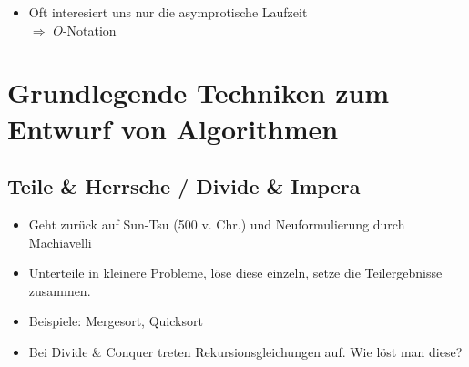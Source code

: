\begin{itemize}
\item   Oft interesiert uns nur die asymprotische Laufzeit \\
        $\Rightarrow$ $O$-Notation
\end{itemize}

\chapter{Grundlegende Techniken zum Entwurf von Algorithmen}
\section{Teile \& Herrsche / Divide \& Impera}
\begin{itemize}
\item   Geht zurück auf Sun-Tsu (500 v. Chr.) und Neuformulierung durch Machiavelli
\item   Unterteile in kleinere Probleme, löse diese einzeln, setze die Teilergebnisse zusammen.
\item   Beispiele: Mergesort, Quicksort
\item   Bei Divide \& Conquer treten Rekursionsgleichungen auf. Wie löst man diese?
\end{itemize}

